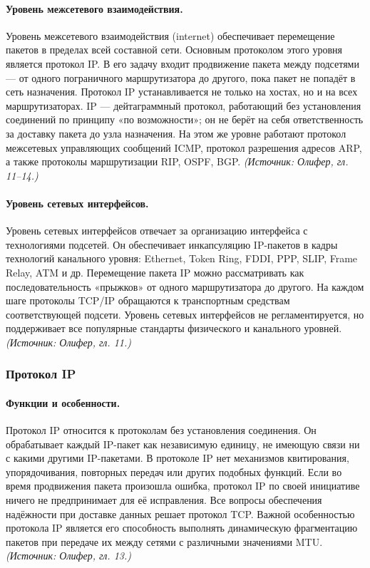 \documentclass[a4paper,12pt]{article}
\begin{document}
\paragraph{Уровень межсетевого взаимодействия.}
Уровень межсетевого взаимодействия (internet) обеспечивает перемещение пакетов в пределах всей составной сети. Основным протоколом этого уровня является протокол IP. В его задачу входит продвижение пакета между подсетями — от одного пограничного маршрутизатора до другого, пока пакет не попадёт в сеть назначения. Протокол IP устанавливается не только на хостах, но и на всех маршрутизаторах. IP — дейтаграммный протокол, работающий без установления соединений по принципу «по возможности»; он не берёт на себя ответственность за доставку пакета до узла назначения. На этом же уровне работают протокол межсетевых управляющих сообщений ICMP, протокол разрешения адресов ARP, а также протоколы маршрутизации RIP, OSPF, BGP.
\textit{(Источник: Олифер, гл. 11–14.)}

\paragraph{Уровень сетевых интерфейсов.}
Уровень сетевых интерфейсов отвечает за организацию интерфейса с технологиями подсетей. Он обеспечивает инкапсуляцию IP-пакетов в кадры технологий канального уровня: Ethernet, Token Ring, FDDI, PPP, SLIP, Frame Relay, ATM и др. Перемещение пакета IP можно рассматривать как последовательность «прыжков» от одного маршрутизатора до другого. На каждом шаге протоколы TCP/IP обращаются к транспортным средствам соответствующей подсети. Уровень сетевых интерфейсов не регламентируется, но поддерживает все популярные стандарты физического и канального уровней.
\textit{(Источник: Олифер, гл. 11.)}

\subsubsection{Протокол IP}

\paragraph{Функции и особенности.}
Протокол IP относится к протоколам без установления соединения. Он обрабатывает каждый IP-пакет как независимую единицу, не имеющую связи ни с какими другими IP-пакетами. В протоколе IP нет механизмов квитирования, упорядочивания, повторных передач или других подобных функций. Если во время продвижения пакета произошла ошибка, протокол IP по своей инициативе ничего не предпринимает для её исправления. Все вопросы обеспечения надёжности при доставке данных решает протокол TCP. Важной особенностью протокола IP является его способность выполнять динамическую фрагментацию пакетов при передаче их между сетями с различными значениями MTU.
\textit{(Источник: Олифер, гл. 13.)}
\end{document}
